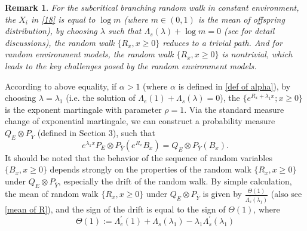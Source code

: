 \documentclass[]{article}
\numberwithin{equation}{section}
\theoremstyle{thmstyleone}%
\theoremstyle{thmstyletwo}%
\newtheorem{remark}{Remark}%
\theoremstyle{thmstylethree}%
\theoremstyle{thmstylefour}%
\theoremstyle{thmstylefive}%
\theoremstyle{thmstylesix}%
\begin{document}
	\begin{remark}
		For the subcritical branching random walk in constant environment, the $ X_i $ in \cref{18} is equal to $ \log m$ (where $m\in (0,1)$ is the mean of offspring distribution), by choosing $\lambda$ such that $\Lambda_s(\lambda)+\log m = 0$ (see \cite{Fu2025} for detail discussions), the random walk $\{R_x, x\geqslant 0\}$ reduces to a trivial path.
		And for random environment models, the random walk $\{R_x,x\geqslant 0\}$ is nontrivial, which leads to the key challenges posed by the random environment models.
	\end{remark}
	
	
	According to above equality, if $\alpha>1$ (where $\alpha$ is  defined in \cref{def of alpha}), by choosing $\lambda= \lambda_1$ (i.e. the solution of $\Lambda_e(1)+\Lambda_s(\lambda)=0$), the $\{e^{R_x + \lambda_1 x};x\geqslant 0\}$ is the exponent martingale with parameter $\rho=1$. Via the standard measure change of exponential martingale, we can construct a probability measure $Q_E\otimes P_{\overline{Y}}$ (defined in Section 3), such that \begin{equation} e^{\lambda_1 x}P_E\otimes P_{\overline{Y}} \left(e^{R_x}B_x\right) = Q_E\otimes P_{\overline{Y}}(B_x). \end{equation}
	It should be noted that the behavior of the sequence of random variables $\{B_x,x\geqslant 0\}$ depends strongly on the properties of the random walk $\{R_x,x\geqslant 0\}$ under $Q_E\otimes P_{\overline{Y}}$, especially the drift of the random walk. By simple calculation, the mean of random walk $\{R_x,x\geqslant 0\}$ under $Q_E\otimes P_{\overline{Y}}$ is given by $\frac{\varTheta(1)}{\Lambda_s^{\prime}(\lambda_1)}$ (also see \cref{mean of R}), and the sign of the drift is equal to the sign of $\varTheta(1)$, where
	\begin{equation}
		\varTheta(1):=\Lambda_e^\prime(1)+\Lambda_s(\lambda_1)-\lambda_1\Lambda_s^\prime(\lambda_1)
	\end{equation}
	
\end{document}
